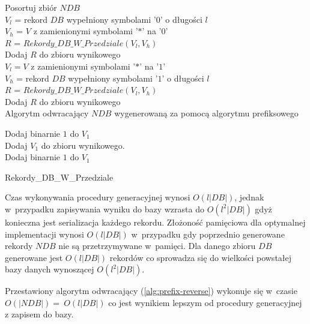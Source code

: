 \begin{algorithm}[!htb]
    \SetAlgoLined
    Posortuj zbiór $NDB$\\
    $V_l$ = rekord $DB$ wypełniony symbolami '$0$' o długości $l$\\
    {
        $V_h$ = $V$ z zamienionymi symbolami '$*$' na '$0$'\\
        $R$ = $Rekordy\_DB\_W\_Przedziale(V_l, V_h)$\\
        Dodaj $R$ do zbioru wynikowego \\
        $V_l = V$ z zamienionymi symbolami '$*$' na '$1$'\\
    }
    $V_h$ = rekord $DB$ wypełniony symbolami '$1$' o długości $l$\\
    $R$ = $Rekordy\_DB\_W\_Przedziale(V_l, V_h)$\\
    Dodaj $R$ do zbioru wynikowego \\
    \caption{Algorytm odwracający $NDB$ wygenerowaną za pomocą algorytmu prefiksowego}
    \label{alg:prefix-reverse}
\end{algorithm}

\begin{algorithm}[!htb]
    \SetAlgoLined
    Dodaj binarnie $1$ do $V_1$\\
    {
       Dodaj $V_1$ do zbioru wynikowego. \\
       Dodaj binarnie $1$ do $V_1$\\
    }
    \caption{Rekordy\_DB\_W\_Przedziale}
    \label{alg:prefix-reverse-print}
\end{algorithm}


Czas wykonywania procedury generacyjnej wynosi $O(l|DB|)$, jednak w~przypadku zapisywania wyniku do bazy wzrasta do $O(l^2|DB|)$ gdyż konieczna jest serializacja każdego rekordu.
Złożoność pamięciowa dla optymalnej implementacji wynosi $O(l|DB|)$ w~przypadku gdy poprzednio generowane rekordy $NDB$ nie są przetrzymywane w~pamięci. 
Dla danego zbioru $DB$ generowane jest $O(l|DB|)$ rekordów co sprowadza się do wielkości powstałej bazy danych wynoszącej $O(l^2|DB|)$.

Przestawiony algorytm odwracający (\ref{alg:prefix-reverse}) wykonuje się w~czasie $O(|NDB|)=~O(l|DB|)$ co jest wynikiem lepszym od procedury generacyjnej z zapisem do bazy.

